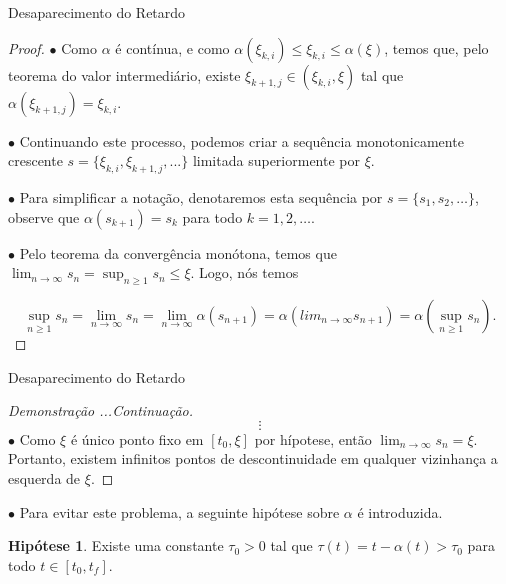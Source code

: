 \documentclass{beamer}
\theoremstyle{plain}
\theoremstyle{definition}
\newtheorem{hip}{Hipótese}
\begin{document}

\begin{frame}{Desaparecimento do Retardo}

    \begin{proof}
        $\bullet$ Como $\alpha$ é contínua, e como $\alpha(\xi_{k,i}) \leq \xi_{k, i} \leq  \alpha(\xi)$, temos que, pelo teorema do valor intermediário, existe $\xi_{k+1, j} \in (\xi_{k,i}, \xi)$ tal que $\alpha(\xi_{k+1, j}) = \xi_{k,i}$. 

        $\bullet$ Continuando este processo, podemos criar a sequência monotonicamente crescente $s = \{\xi_{k, i}, \xi_{k+1, j}, ...\}$ limitada superiormente por $\xi$. 

        $\bullet$ Para simplificar a notação, denotaremos esta sequência por $s = \{ s_1, s_2, \dots \}$, observe que $\alpha(s_{k+1}) = s_k$ para todo $k = 1, 2, \dots$. 

        $\bullet$ Pelo teorema da convergência monótona, temos que $\lim_{n \to \infty} s_n = \sup_{n \geq 1} s_n \leq \xi$. Logo, nós temos

        \noindent
        \[
            \sup_{n \geq 1} s_n = \lim_{n \to \infty} s_n  = 
            \lim_{n \to \infty} \alpha(s_{n+1}) = 
            \alpha(lim_{n \to \infty} s_{n+1}) = 
            \alpha\left(\sup_{n \geq 1} s_n \right).
        \]

    \renewcommand{\qedsymbol}{}

    \end{proof}
\end{frame}


\begin{frame}{Desaparecimento do Retardo}


    \begin{proof}[Demonstração ...Continuação]
        \[
            \vdots
        \]
        $\bullet$ Como $\xi$ é único ponto fixo em $[t_0, \xi]$ por hípotese, então $\lim_{n \to \infty} s_n = \xi$. Portanto, existem infinitos pontos de descontinuidade em qualquer vizinhança a esquerda de $\xi$.
    \end{proof}

    $\bullet$ Para evitar este problema, a seguinte hipótese sobre $\alpha$ é introduzida.

    \begin{hip}
        Existe uma constante $ \tau_0 > 0 $ tal que $ \tau(t) = t - \alpha(t) > \tau_0 $ para todo $ t \in [t_0, t_f] $.
        \label{H1:hipotese:hypothesis}
    \end{hip}


\end{frame}
\end{document}
